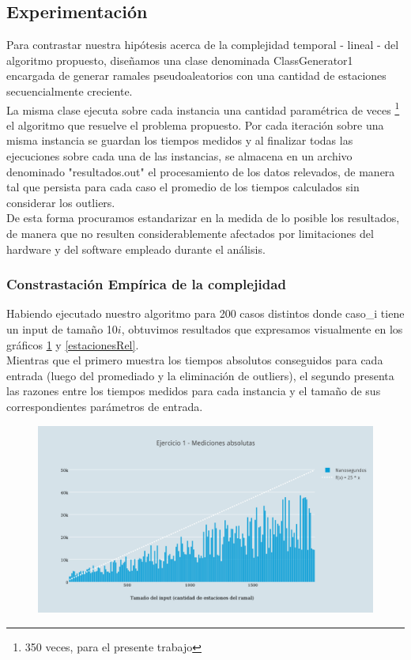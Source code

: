 \subsection{Experimentaci\'on}

Para contrastar nuestra hipótesis acerca de la complejidad temporal - lineal - del algoritmo propuesto, diseñamos una clase denominada ClassGenerator1 encargada de generar ramales pseudoaleatorios con una cantidad de estaciones secuencialmente creciente.\\ 
La misma clase ejecuta sobre cada instancia una cantidad paramétrica de veces \footnote{350 veces, para el presente trabajo} el algoritmo que resuelve el problema propuesto. Por cada iteración sobre una misma instancia se guardan los tiempos medidos y al finalizar todas las ejecuciones sobre cada una de las instancias, se almacena en un archivo denominado "resultados.out" el procesamiento de los datos relevados, de manera tal que persista para cada caso el promedio de los tiempos calculados sin considerar los outliers.\\
De esta forma procuramos estandarizar en la medida de lo posible los resultados, de manera que no resulten considerablemente afectados por limitaciones del hardware y del software empleado durante el análisis. \\
 \newpage

\subsubsection{Constrastaci\'on Emp\'irica de la complejidad}

Habiendo ejecutado nuestro algoritmo para 200 casos distintos donde caso_{i} tiene un input de tamaño 10$i$, obtuvimos resultados que expresamos visualmente en los gráficos  \ref{estacionesAbs} y \ref{estacionesRel}.\\
Mientras que el primero muestra los tiempos absolutos conseguidos para cada entrada (luego del promediado y la eliminación de outliers), el segundo presenta las razones entre los tiempos medidos para cada instancia y el tamaño de sus correspondientes parámetros de entrada. 


  \begin{figure}[h!]
   \begin{center}
 	\includegraphics[scale=0.8]{imagenes/ej1/absolutas.png}
	\label{estacionesAbs}
   \end{center}
 \end{figure}
 
